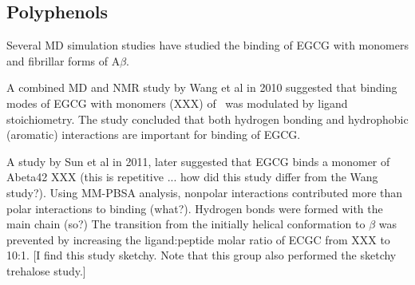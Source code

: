 \subsection{Polyphenols}

Several MD simulation studies have studied the binding of EGCG with monomers and fibrillar forms of A$\beta$. 

A combined MD and NMR study by Wang et al in 2010\cite{Wang:2010p5887} suggested that binding modes of EGCG with monomers (XXX) of \ was modulated by ligand stoichiometry. The study concluded that both hydrogen bonding and hydrophobic (aromatic) interactions are important for binding of EGCG.

A study by Sun et al in 2011,\cite{Liu:2011ka} later suggested that EGCG binds a monomer of Abeta42 XXX (this is repetitive ... how did this study differ from the Wang study?).  Using MM-PBSA analysis, nonpolar interactions contributed more than polar interactions to binding (what?). Hydrogen bonds were formed with the main chain (so?)  The transition from the initially helical conformation to $\beta$ was prevented by increasing the ligand:peptide molar ratio of ECGC from XXX to 10:1. [I find this study sketchy. Note that this group also performed the sketchy trehalose study.]



